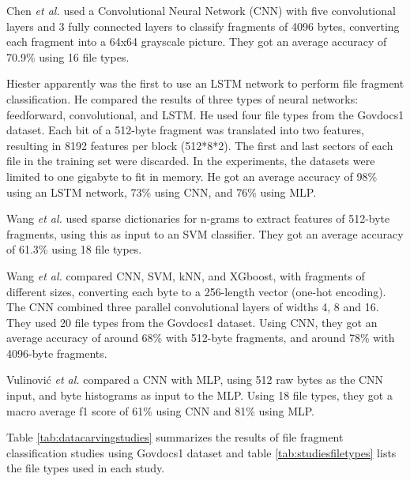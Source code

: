 Chen \textit{et al.} \cite{chen_file_2018}
used a Convolutional Neural Network (CNN) with five convolutional layers and 3 fully connected layers to classify fragments of 4096 bytes, converting each fragment into a 64x64 grayscale picture.
They got an average accuracy of 70.9\% using 16 file types.

Hiester \cite{hiester_file_2018} apparently was the first to use an LSTM network to perform file fragment classification. He compared the results of three types of neural networks: feedforward, convolutional, and LSTM. He used four file types from the Govdocs1 dataset.
Each bit of a 512-byte fragment was translated into two features, resulting in 8192 features per block (512*8*2). The first and last sectors of each file in the training set were discarded. In the experiments, the datasets were limited to one gigabyte to fit in memory. He got an average accuracy of 98\% using an LSTM network, 73\% using CNN, and 76\% using MLP.

Wang \textit{et al.} \cite{wang_sparse_2018} 
used sparse dictionaries for n-grams to extract features of 512-byte fragments, using this as input to an SVM classifier.
They got an average accuracy of 61.3\% using 18 file types.

Wang \textit{et al.} \cite{wang_file_2018}  
compared CNN, SVM, kNN, and XGboost, with fragments of different sizes, converting each byte to a 256-length vector (one-hot encoding). The CNN combined three parallel convolutional layers of widths 4, 8 and 16.
They used 20 file types from the Govdocs1 dataset.
Using CNN, they got an average accuracy of around 68\% with 512-byte fragments, and around 78\% with 4096-byte fragments.

Vulinović \textit{et al.} \cite{vulinovic_neural_2019}
compared a CNN with MLP, using 512 raw bytes as the CNN input, and byte histograms as input to the MLP.
Using 18 file types, they got a macro average f1 score of 61\% using CNN and 81\% using MLP.

Table \ref{tab:datacarvingstudies} summarizes 
the results of file fragment classification studies using Govdocs1 dataset and table \ref{tab:studiesfiletypes}
lists the file types used in each study.




